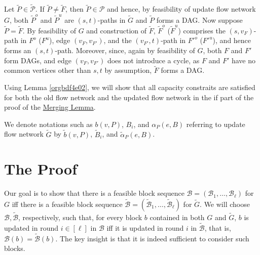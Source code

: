 \documentclass[fontsize=11pt,paper=a4]{book}
\begin{document}
Let \(\tilde{P}\in\tilde{\mathcal{P}}\).
If \(\tilde{P}\neq\tilde{F}\), then \(\tilde{P}\in\mathcal{P}\) and hence, by feasibility of update flow network \(G\), both \(\tilde{P}^o\) and \(\tilde{P}^u\) are \((s,t)\)-paths in \(\tilde{G}\) and \(\tilde{P}\) forms a DAG.
Now suppose \(\tilde{P}=\tilde{F}\).
By feasibility of \(G\) and construction of \(\tilde{F}\), \(\tilde{F}^o\) (\(\tilde{F}^u\)) comprises the \((s,v_F)\)-path in \(F^o\) (\(F^u\)), edge \((v_F,v_{F'})\), and the \((v_{F'},t)\)-path in \(F'^o\) (\(F'^u\)), and hence forms an \((s,t)\)-path.
Moreover, since, again by feasibility of \(G\), both \(F\) and \(F'\) form DAGs, and edge \((v_F,v_{F'})\) does not introduce a cycle, as \(F\) and \(F'\) have no common vertices other than \(s,t\) by assumption, \(\tilde{F}\) forms a DAG.

Using Lemma \ref{orgbdf4e02}, we will show that all capacity constraits are satisfied for both the old flow network and the updated flow network in the if part of the proof of the \hyperref[orgf9b0f0c]{Merging Lemma}.

We denote notations such as \(b(v,P)\), \(B_i\), and \(\alpha_P(e,B)\) referring to update flow network \(\tilde{G}\) by \(\tilde{b}(v,P)\), \(\tilde{B}_i\), and \(\tilde{\alpha}_P(e,B)\).

\section{The Proof}
\label{sec:org5a86b56}

Our goal is to show that there is a feasible block sequence \(\mathcal{B}=(\mathscr{B}_1,\dots,\mathscr{B}_{\ell})\) for \(G\) iff there is a feasible block sequence \(\tilde{\mathcal{B}}=(\tilde{\mathscr{B}}_1,\dots,\tilde{\mathscr{B}}_{\ell})\) for \(\tilde{G}\).
We will choose \(\mathcal{B},\tilde{\mathcal{B}}\), respectively, such that, for every block \(b\) contained in both \(G\) and \(\tilde{G}\), \(b\) is updated in round \(i\in[\ell]\) in \(\mathcal{B}\) iff it is updated in round \(i\) in \(\tilde{\mathcal{B}}\), that is, \(\mathcal{B}(b)=\tilde{\mathcal{B}}(b)\).
The key insight is that it is indeed sufficient to consider such blocks.
\end{document}
